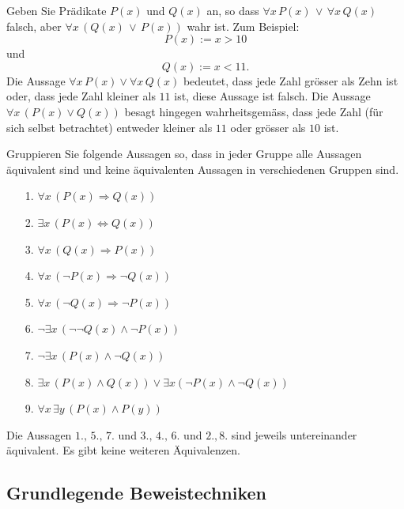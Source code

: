 \begin{example}
    Geben Sie Prädikate $P(x)$ und $Q(x)$ an, so dass $\forall x\,P(x)\,\lor\,\forall x\,Q(x)$ falsch, aber $\forall x\,(Q(x)\,\lor\, P(x))$ wahr ist.
    \tcblower
    Zum Beispiel:
    $$
        P(x):= x>10
    $$
    und
    $$
        Q(x):= x<11.
    $$
    Die Aussage $\forall x\, P(x)\lor \forall x\,Q(x)$ bedeutet, dass jede Zahl grösser als Zehn ist oder, dass jede Zahl kleiner als $11$ ist, diese Aussage ist falsch. Die Aussage $\forall x\,(P(x)\lor Q(x))$ besagt hingegen wahrheitsgemäss, dass jede Zahl (für sich selbst betrachtet) entweder kleiner als $11$ oder grösser als $10$ ist.
\end{example}

\begin{example}
    Gruppieren Sie folgende Aussagen so, dass in jeder Gruppe alle Aussagen äquivalent sind und keine äquivalenten Aussagen in verschiedenen Gruppen sind.
    \begin{itemize}
        \item[1.] $\forall x\,(P(x)\Rightarrow Q(x))$
        \item[2.] $\exists x\,(P(x)\Leftrightarrow Q(x))$
        \item[3.] $\forall x\,(Q(x)\Rightarrow P(x))$
        \item[4.] $\forall x\,(\neg P(x)\Rightarrow \neg Q(x))$
        \item[5.] $\forall x\,(\neg Q(x)\Rightarrow \neg P(x))$
        \item[6.] $\neg\exists x\,(\neg \neg Q(x)\land\neg P(x) )$
        \item[7.] $\neg\exists x\,(P(x)\land\neg Q(x))$
        \item[8.] $\exists x\, (P(x)\land Q(x))\lor \exists x (\neg P(x)\land\neg Q(x))$
        \item[9.] $\forall x\,\exists y\,(P(x)\land P(y))$
    \end{itemize}
    \tcblower
    Die Aussagen $1.,\,5.,\,7.$ und $3.,\,4.,\,6.$ und $2.,8.$ sind jeweils untereinander äquivalent. Es gibt keine weiteren Äquivalenzen.
\end{example}

\subsection{Grundlegende Beweistechniken}

